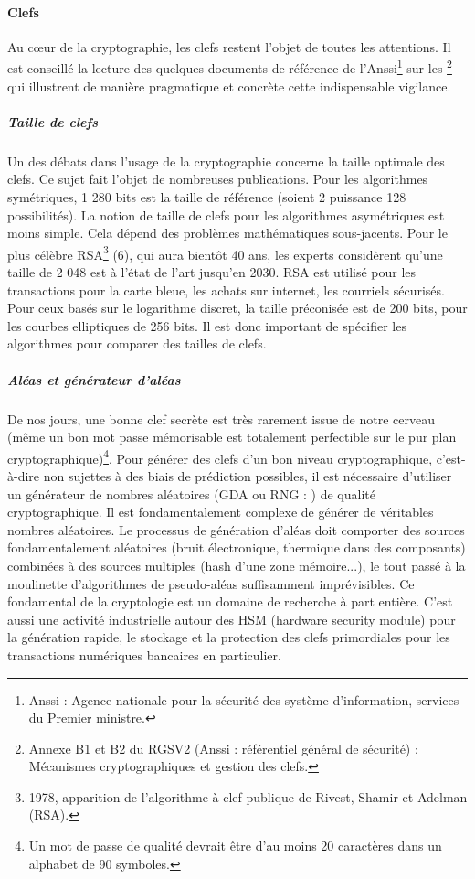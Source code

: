 \paragraph{Clefs}
Au cœur de la cryptographie, les clefs restent l'objet de toutes les attentions. Il est conseillé la lecture des quelques documents de référence de l'Anssi\footnote{Anssi : Agence nationale pour la sécurité des système d'information, services du Premier ministre.} sur les  \footnote{Annexe B1 et B2 du RGSV2 (Anssi : référentiel général de sécurité) : Mécanismes cryptographiques et gestion des clefs.} qui illustrent de manière pragmatique et concrète cette indispensable vigilance.
\subparagraph{Taille de clefs}
Un des débats dans l'usage de la cryptographie concerne la taille optimale des clefs. Ce sujet fait l'objet de nombreuses publications. Pour les algorithmes symétriques, 1 280 bits est la taille de référence (soient 2 puissance 128 possibilités). La notion de taille de clefs pour les algorithmes asymétriques est moins simple. Cela dépend des problèmes mathématiques sous-jacents. Pour le plus célèbre RSA\footnote{1978, apparition de l'algorithme à clef publique de Rivest, Shamir et Adelman (RSA).} (6), qui aura bientôt 40 ans, les experts considèrent qu'une taille de 2 048 est à l'état de l'art jusqu'en 2030. RSA est utilisé pour les transactions pour la carte bleue, les achats sur internet, les courriels sécurisés. Pour ceux basés sur le logarithme discret, la taille préconisée est de 200 bits, pour les courbes elliptiques de 256 bits. Il est donc important de spécifier les algorithmes pour comparer des tailles de clefs.
\subparagraph{Aléas et générateur d'aléas}
De nos jours, une bonne clef secrète est très rarement issue de notre cerveau (même un bon mot passe mémorisable est totalement perfectible sur le pur plan cryptographique)\footnote{Un mot de passe de qualité  devrait être d'au moins 20 caractères dans un alphabet de 90 symboles.}. Pour générer des clefs d'un bon niveau cryptographique, c'est-à-dire non sujettes à des biais de prédiction possibles, il est nécessaire d'utiliser un générateur de nombres aléatoires (GDA ou RNG : ) de qualité cryptographique. Il est fondamentalement complexe de générer de véritables nombres aléatoires. Le processus de génération d'aléas doit comporter des sources fondamentalement aléatoires (bruit électronique, thermique dans des composants) combinées à des sources multiples (hash d'une zone mémoire...), le tout passé à la moulinette d'algorithmes de pseudo-aléas suffisamment imprévisibles. Ce fondamental de la cryptologie est un domaine de recherche à part entière. C'est aussi une activité industrielle autour des HSM (hardware security module) pour la génération rapide, le stockage et la protection des clefs primordiales pour les transactions numériques bancaires en particulier.
